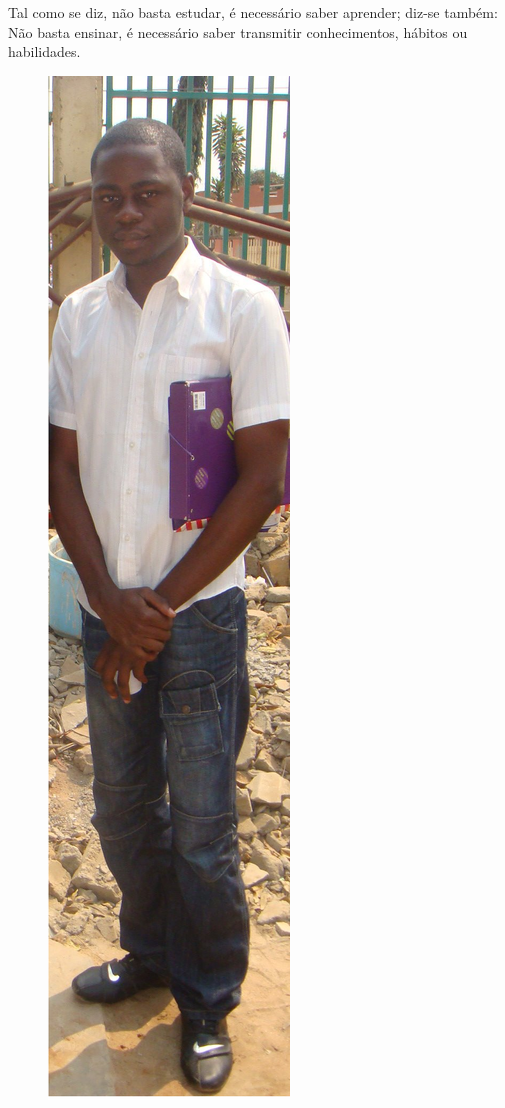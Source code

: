 


\cappar Tal como se diz, não basta estudar, é necessário saber aprender; diz-se também: Não basta ensinar, é necessário saber transmitir conhecimentos, hábitos ou habilidades.
\vspace{0.5cm}
\begin{figure} 
  \vspace{-55pt}
  \begin{figurebox}
   \vspace{20pt}
    \centering
    \includegraphics[height=0.75\textheight]{hbc.png}\\

\end{figurebox}
\end{figure}
